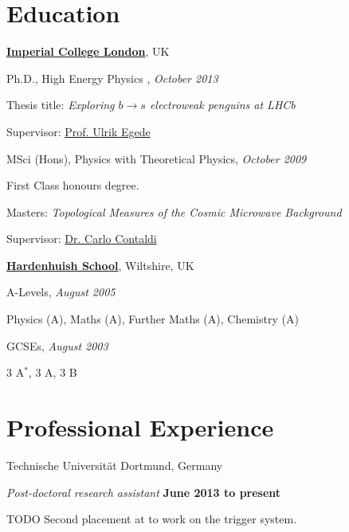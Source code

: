 \documentclass[10pt]{article}
\renewenvironment{compactitem}{
  \begin{list}{}{
    \setlength{\leftmargin}{1.5em}
  }
}{
  \end{list}
}
\def\tud{Technische Universit\"at Dortmund}
\def\icl{Imperial College London}
\begin{document}
\section*{Education}
%
\href{http://www.imperial.ac.uk/}{\textbf{\icl}}, UK
\begin{compactitem}
\item Ph.D., High Energy Physics , \textit{October 2013}
        \begin{compactitem}
        \item Thesis title: \emph{Exploring $b\rightarrow s$ electroweak penguins at LHCb}
        \item Supervisor: \href{http://www3.imperial.ac.uk/people/u.egede}{Prof. Ulrik Egede}
        \end{compactitem}
\item MSci (Hons), {Physics with Theoretical Physics}, \textit{October 2009}
        \begin{compactitem}
        \item First Class honours degree.
        \item Masters: \emph{Topological Measures of the Cosmic Microwave Background}
        \item Supervisor:  \href{http://www3.imperial.ac.uk/people/c.contaldi}{Dr. Carlo Contaldi}
        \end{compactitem}
\end{compactitem}
\href{http://www.hardenhuish.wilts.sch.uk/hardenhuish/site/}{\textbf{Hardenhuish School}}, Wiltshire, UK
\begin{compactitem}
\item A-Levels, \textit{August 2005}
        \begin{compactitem}
        \item Physics (A), Maths (A), Further Maths (A), Chemistry (A)
        \end{compactitem}
\item GCSEs, \textit{August 2003}
        \begin{compactitem}
        \item 3 A$^{*}$, 3 A, 3 B
        \end{compactitem}
\end{compactitem}

\section*{Professional Experience}
\tud, Germany
\begin{compactitem}
\item \textit{Post-doctoral research assistant}%
        \hfill \textbf{June 2013 to present}
\begin{compactitem}
\item TODO
Second placement at \cern to work on the \lhcb trigger system. 
\end{compactitem}
\end{compactitem}
\end{document}
